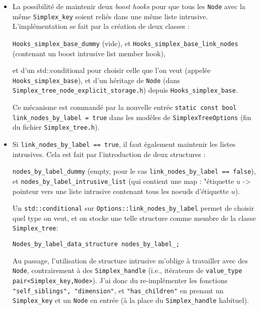 \documentclass[11pt]{amsart}
\numberwithin{equation}{section}
\theoremstyle{plain}
\theoremstyle{definition}
\begin{document}
\begin{itemize}
\item La possibilité de maintenir deux \emph{boost hooks} pour que tous les {\tt Node} avec la même {\tt Simplex\_key} soient reliés dans une même liste intrusive. L'implémentation se fait par la création de deux classes :

\medskip

{\tt Hooks\_simplex\_base\_dummy} (vide), et
{\tt Hooks\_simplex\_base\_link\_nodes} (contenant un boost intrusive list member hook),

\medskip

et d'un std::conditional pour choisir celle que l'on veut (appelée {\tt Hooks\_simplex\_base}), et d'un héritage de {\tt Node} (dans {\tt Simplex\_tree\_node\_explicit\_storage.h}) depuis {\tt Hooks\_simplex\_base}.

\medskip

Ce mécanisme est commandé par la nouvelle entrée {\tt static const bool link\_nodes\_by\_label = true} dans les modèles de {\tt SimplexTreeOptions} (fin du fichier {\tt Simplex\_tree.h}).

\item Si {\tt link\_nodes\_by\_label == true}, il faut également maintenir les listes intrusives. Cela est fait par l'introduction de deux structures :

\medskip

{\tt nodes\_by\_label\_dummy} (empty, pour le cas {\tt link\_nodes\_by\_label == false}), et 
{\tt nodes\_by\_label\_intrusive\_list} (qui contient une map : "étiquette $u$ -> pointeur vers une liste intrusive contenant tous les noeuds d'étiquette $u$).

Un {\tt std::conditional} sur {\tt Options::link\_nodes\_by\_label} permet de choisir quel type on veut, et on stocke une telle structure comme membre de la classe {\tt Simplex\_tree}:

\medskip

  {\tt Nodes\_by\_label\_data\_structure        nodes\_by\_label\_;}

\medskip

Au passage, l'utilisation de structure intrusive m'oblige à travailler avec des {\tt Node}, contrairement à des {\tt Simplex\_handle} (i.e., itérateurs de {\tt value\_type pair<Simplex\_key,Node>}). J'ai donc du re-implémenter les fonctions {\tt "self\_siblings", "dimension"}, et {\tt "has\_children"} en prenant un {\tt Simplex\_key} et un {\tt Node} en entrée (à la place du {\tt Simplex\_handle} habituel).


\end{itemize}
\end{document}
